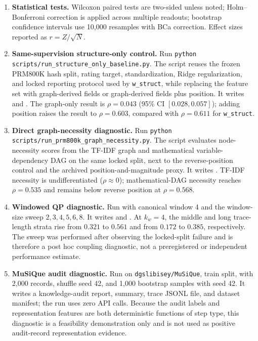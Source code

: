 \documentclass[a4paper,fleqn]{cas-sc}
\begin{document}
\begin{enumerate}
\item \textbf{Statistical tests.} Wilcoxon paired tests are two-sided unless noted; Holm--Bonferroni correction is applied across multiple readouts; bootstrap confidence intervals use 10{,}000 resamples with BCa correction. Effect sizes reported as $r = Z/\sqrt{N}$.
\item \textbf{Same-supervision structure-only control.} Run \texttt{python scripts/run\_structure\_only\_baseline.py}. The script reuses the frozen PRM800K hash split, rating target, standardization, Ridge regularization, and locked reporting protocol used by \texttt{w\_struct}, while replacing the feature set with graph-derived fields or graph-derived fields plus position. It writes  and . The graph-only result is $\rho=0.043$ (95\% CI $[0.028,0.057]$); adding position raises the result to $\rho=0.603$, compared with $\rho=0.611$ for \texttt{w\_struct}.
\item \textbf{Direct graph-necessity diagnostic.} Run \texttt{python scripts/run\_prm800k\_graph\_necessity.py}. The script evaluates node-necessity scores from the TF-IDF graph and mathematical variable-dependency DAG on the same locked split, next to the reverse-position control and the archived position-and-magnitude proxy. It writes . TF-IDF necessity is undifferentiated ($\rho\approx0$); mathematical-DAG necessity reaches $\rho=0.535$ and remains below reverse position at $\rho=0.568$.
\item \textbf{Windowed QP diagnostic.} Run  with canonical window 4 and the window-size sweep $2,3,4,5,6,8$. It writes  and . At $k_w=4$, the middle and long trace-length strata rise from $0.321$ to $0.561$ and from $0.172$ to $0.385$, respectively. The sweep was performed after observing the locked-split failure and is therefore a post hoc coupling diagnostic, not a preregistered or independent performance estimate.
\item \textbf{MuSiQue audit diagnostic.} Run  on \texttt{dgslibisey/MuSiQue}, train split, with 2,000 records, shuffle seed 42, and 1,000 bootstrap samples with seed 42. It writes a knowledge-audit report, summary, trace JSONL file, and dataset manifest; the run uses zero API calls. Because the audit labels and representation features are both deterministic functions of step type, this diagnostic is a feasibility demonstration only and is not used as positive audit-record representation evidence.

\end{enumerate}
\end{document}

